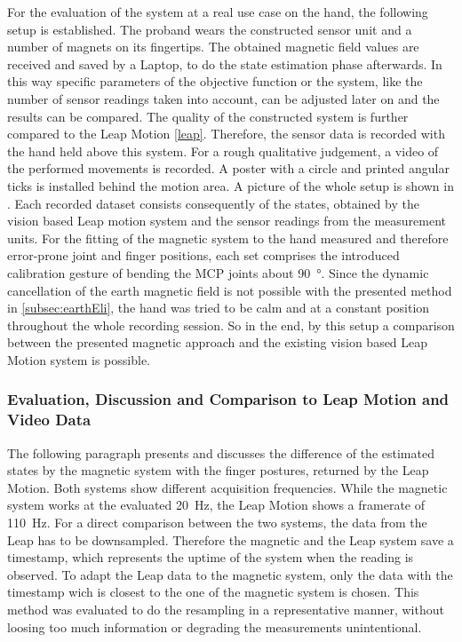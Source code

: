 For the evaluation of the system at a real use case on the hand, the following setup is established. The proband wears the constructed sensor unit and a number of magnets on its fingertips. The obtained magnetic field values are received and saved by a Laptop, to do the state estimation phase afterwards. In this way specific parameters of the objective function or the system, like the number of sensor readings taken into account, can be adjusted later on and the results can be compared. The quality of the constructed system is further compared to the Leap Motion \ref{leap}. Therefore, the sensor data is recorded with the hand held above this system. For a rough qualitative judgement, a video of the performed movements is recorded. A poster with a circle and printed angular ticks is installed behind the motion area. A picture of the whole setup is shown in . Each recorded dataset consists consequently of the states, obtained by the vision based Leap motion system and the sensor readings from the measurement units. For the fitting of the magnetic system to the hand measured and therefore error-prone joint and finger positions, each set comprises the introduced calibration gesture of bending the \ac{MCP} joints about \SI{90}{\degree}. Since the dynamic cancellation of the earth magnetic field is not possible with the presented method in \ref{subsec:earthEli}, the hand was tried to be calm and at a constant position throughout the whole recording session. So in the end, by this setup a comparison between the presented magnetic approach and the existing vision based Leap Motion system is possible.

\subsubsection{Evaluation, Discussion and Comparison to Leap Motion and Video Data}

The following paragraph presents and discusses the difference of the estimated states by the magnetic system with the finger postures, returned by the Leap Motion. Both systems show different acquisition frequencies. While the magnetic system works at the evaluated \SI{20}{\Hz}, the Leap Motion shows a framerate of \SI{110}{\Hz}. For a direct comparison between the two systems, the data from the Leap has to be downsampled. Therefore the magnetic and the Leap system save a timestamp, which represents the uptime of the system when the reading is observed. To adapt the Leap data to the magnetic system, only the data with the timestamp wich is closest to the one of the magnetic system is chosen. This method was evaluated to do the resampling in a representative manner, without loosing too much information or degrading the measurements unintentional. 

